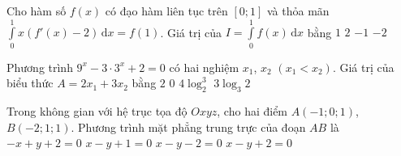 \begin{ex}%
Cho hàm số $f(x)$ có đạo hàm liên tục trên $[0;1]$ và thỏa mãn $\displaystyle \int \limits_0^1 x \left( f'(x)-2 \right) \mathrm{\,d}x=f(1)$. Giá trị của $I=\displaystyle \int \limits_0^1 f(x) \mathrm{\,d}x$ bằng
\choice
{$1$}
{$2$}
{$-1$}
{\True $-2$} 
\end{ex}

\begin{ex}%
Phương trình $9^x-3\cdot 3^x+2=0$ có hai nghiệm $x_1$, $x_2$ $(x_1<x_2)$. Giá trị của biểu thức $A=2x_1+3x_2$ bằng  
\choice
{$2$}
{$0$}
{$4\log_2^3$}
{\True $3\log_3 2$} 
\end{ex}

\begin{ex}%
Trong không gian với hệ trục tọa độ $Oxyz$, cho hai điểm $A(-1;0;1)$, $B(-2;1;1)$. Phương trình mặt phẳng trung trực của đoạn $AB$ là
\choice
{$-x+y+2=0$}
{$x-y+1=0$}
{$x-y-2=0$}
{\True $x-y+2=0$} 
\end{ex}

